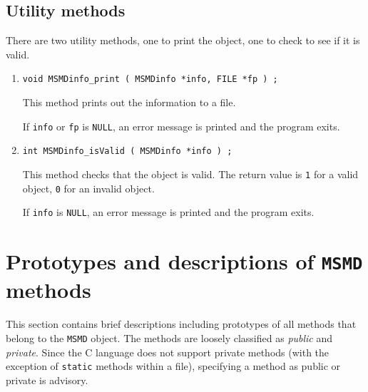 \subsection{Utility methods}
\label{subsection:MSMDinfo:proto:utility}
\par
There are two utility methods, one to print the object, one to
check to see if it is valid.
\par
\begin{enumerate}
\item
\begin{verbatim}
void MSMDinfo_print ( MSMDinfo *info, FILE *fp ) ;
\end{verbatim}
This method prints out the information to a file.
\par {}
If {\tt info} or {\tt fp} is {\tt NULL},
an error message is printed and the program exits.
\item
\begin{verbatim}
int MSMDinfo_isValid ( MSMDinfo *info ) ;
\end{verbatim}
This method checks that the object is valid.
The return value is {\tt 1} for a valid object, 
{\tt 0} for an invalid object.
\par {}
If {\tt info} is {\tt NULL},
an error message is printed and the program exits.
\end{enumerate}
\par
\section{Prototypes and descriptions of {\tt MSMD} methods}
\label{section:MSMD:proto}
\par
This section contains brief descriptions including prototypes
of all methods that belong to the {\tt MSMD} object.
The methods are loosely classified as {\it public} and {\it private}.
Since the C language does not support private methods (with the
exception of {\tt static} methods within a file), 
specifying a method as public or private is advisory.
\par
